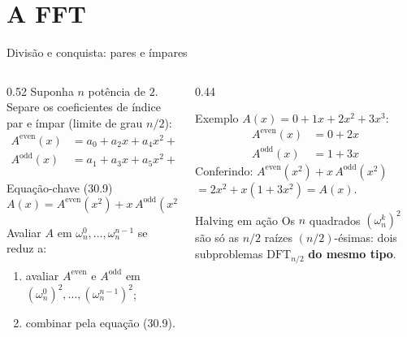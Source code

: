 \documentclass[aspectratio=169,10pt]{beamer}
\newcommand{\w}[2][n]{\omega_{#1}^{#2}}       %
\newcommand{\Aev}{A^{\mathrm{even}}}
\newcommand{\Aod}{A^{\mathrm{odd}}}
\newcommand{\DFT}{\mathrm{DFT}}
\begin{document}
\section{A FFT}

\begin{frame}{Divisão e conquista: pares e ímpares}
  \begin{columns}[T]
    \begin{column}{0.52\textwidth}
      Suponha $n$ potência de $2$. Separe os coeficientes de índice par e ímpar
      (limite de grau $n/2$):
      \begin{align*}
        \Aev(x) &= a_0 + a_2x + a_4x^2 + \cdots + a_{n-2}x^{n/2-1}\\
        \Aod(x) &= a_1 + a_3x + a_5x^2 + \cdots + a_{n-1}x^{n/2-1}
      \end{align*}
      \begin{block}{Equação-chave (30.9)}
        \[
          A(x) = \Aev(x^2) + x\,\Aod(x^2)
        \]
      \end{block}
      Avaliar $A$ em $\w{0},\dots,\w{n-1}$ se reduz a:
      \begin{enumerate}
        \item avaliar $\Aev$ e $\Aod$ em $(\w{0})^2,\dots,(\w{n-1})^2$;
        \item combinar pela equação (30.9).
      \end{enumerate}
    \end{column}
    \begin{column}{0.44\textwidth}
      \begin{exampleblock}{Exemplo}
        $A(x) = 0 + 1x + 2x^2 + 3x^3$:
        \begin{align*}
          \Aev(x) &= 0 + 2x\\
          \Aod(x) &= 1 + 3x
        \end{align*}
        Conferindo: $\Aev(x^2) + x\,\Aod(x^2)$\\
        $= 2x^2 + x(1 + 3x^2) = A(x)$.
      \end{exampleblock}
      \begin{alertblock}{Halving em ação}
        \small Os $n$ quadrados $(\w{k})^2$ são só as $n/2$ raízes
        $(n/2)$-ésimas: dois subproblemas $\DFT_{n/2}$ \textbf{do mesmo tipo}.
      \end{alertblock}
    \end{column}
  \end{columns}
\end{frame}
\end{document}
